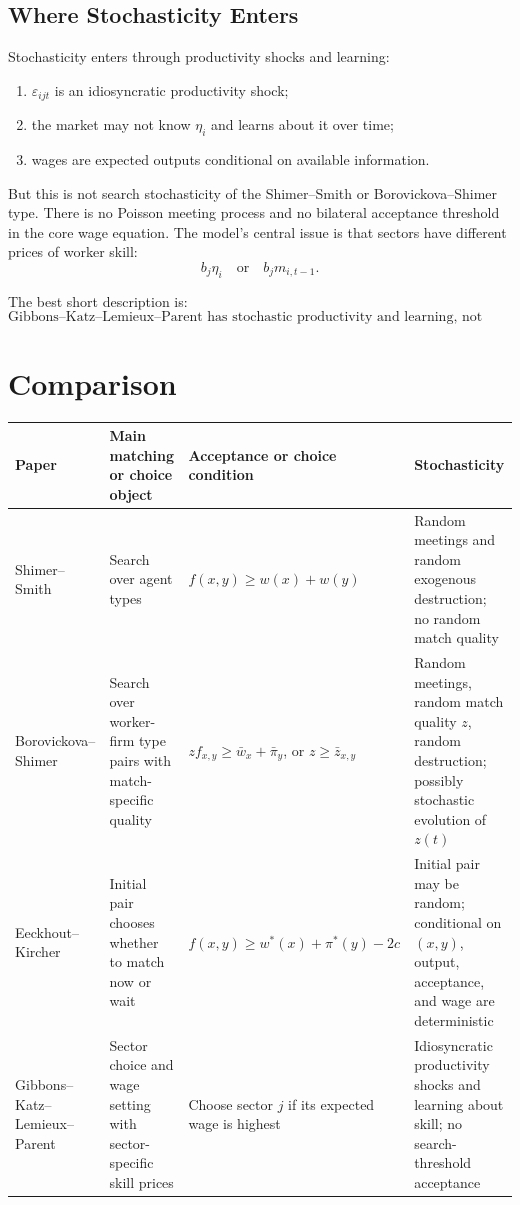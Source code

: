 \documentclass[11pt]{article}
\newcommand{\1}{\mathbf{1}}
\begin{document}
\subsection{Where Stochasticity Enters}

Stochasticity enters through productivity shocks and learning:
\begin{enumerate}
    \item $\varepsilon_{ijt}$ is an idiosyncratic productivity shock;
    \item the market may not know $\eta_i$ and learns about it over time;
    \item wages are expected outputs conditional on available information.
\end{enumerate}

But this is not search stochasticity of the Shimer--Smith or Borovickova--Shimer type. There is no Poisson meeting process and no bilateral acceptance threshold in the core wage equation. The model's central issue is that sectors have different prices of worker skill:
\[
b_j \eta_i
\quad\text{or}\quad
b_j m_{i,t-1}.
\]

The best short description is:
\[
\boxed{\text{Gibbons--Katz--Lemieux--Parent has stochastic productivity and learning, not search-threshold acceptance.}}
\]

\section{Comparison}

\begin{center}
\begin{tabular}{p{}p{}p{}p{}}
\toprule
Paper & Main matching or choice object & Acceptance or choice condition & Stochasticity \\
\midrule
Shimer--Smith & Search over agent types & $f(x,y)\geq w(x)+w(y)$ & Random meetings and random exogenous destruction; no random match quality \\
\addlinespace
Borovickova--Shimer & Search over worker-firm type pairs with match-specific quality & $z f_{x,y}\geq \bar w_x+\bar \pi_y$, or $z\geq \bar z_{x,y}$ & Random meetings, random match quality $z$, random destruction; possibly stochastic evolution of $z(t)$ \\
\addlinespace
Eeckhout--Kircher & Initial pair chooses whether to match now or wait & $f(x,y)\geq w^*(x)+\pi^*(y)-2c$ & Initial pair may be random; conditional on $(x,y)$, output, acceptance, and wage are deterministic \\
\addlinespace
Gibbons--Katz--Lemieux--Parent & Sector choice and wage setting with sector-specific skill prices & Choose sector $j$ if its expected wage is highest & Idiosyncratic productivity shocks and learning about skill; no search-threshold acceptance \\
\bottomrule
\end{tabular}
\end{center}
\end{document}
